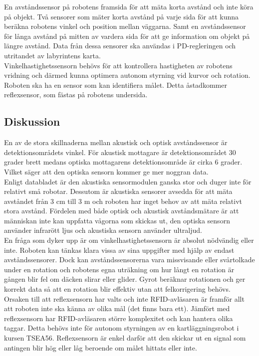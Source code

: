\documentclass[11pt]{article}
\begin{document}
\begin{flushleft}
En avståndssensor på robotens framsida för att mäta korta avstånd och inte köra på objekt. Två sensorer som mäter korta avstånd på varje sida för att kunna beräkna robotens vinkel och position mellan väggarna. Samt en avståndssensor för långa avstånd på mitten av vardera sida för att ge information om objekt på längre avstånd. Data från dessa sensorer ska användas i PD-regleringen och utritandet av labyrintens karta.
\\[0.1in]

Vinkelhastighetssensorn behövs för att kontrollera hastigheten av robotens vridning och därmed kunna optimera autonom styrning vid kurvor och rotation. Roboten ska ha en sensor som kan identifiera målet. Detta åstadkommer reflexsensor, som fästas på robotens undersida.


\subsection{Diskussion}
En av de stora skillnaderna mellan akustisk och optisk avståndssensor är detektionsområdets vinkel. För akustisk mottagare är detektionsområdet 30 grader brett medans optiska mottagarens detektionsområde är cirka 6 grader. Vilket säger att den optiska sensorn kommer ge mer noggran data.
\\[0.1in]

Enligt databladet är den akustiska sensormodulen ganska stor och duger inte för relativt små robotar. Dessutom är akustiska sensorer avsedda för att mäta avståndet från 3 cm till 3 m och roboten har inget behov av att mäta relativt stora avstånd. Fördelen med både optisk och akustisk avståndsmätare är att människan inte kan uppfatta vågorna som skickas ut, den optiska sensorn använder infrarött ljus och akustiska sensorn använder ultraljud.
\\[0.1in]

En fråga som dyker upp är om vinkelhastighetssensorn är absolut nödvändig eller inte. Roboten kan tänkas klara vissa av sina uppgifter med hjälp av endast avståndssensorer. Dock kan avståndssensorerna vara missvisande eller svårtolkade under en rotation och robotens egna uträkning om hur långt en rotation är gången blir fel om däcken slirar eller glider. Gyrot beräknar rotationen och ger korrekt data så att en rotation blir effektiv utan att felkorrigering behövs.
\\[0.1in]

Orsaken till att reflexsensorn har valts och inte RFID-avläsaren är framför allt att roboten inte ska känna av olika mål (det finns bara ett). Jämfört med reflexsensorn har RFID-avläsaren större komplexitet och kan hantera olika taggar. Detta behövs inte för autonom styrningen av en kartläggningsrobot i kursen TSEA56. Reflexsensorn är enkel darför att den skickar ut en signal som antingen blir hög eller låg beroende om målet hittats eller inte.
\\[0.1in]


\end{flushleft}
\end{document}
